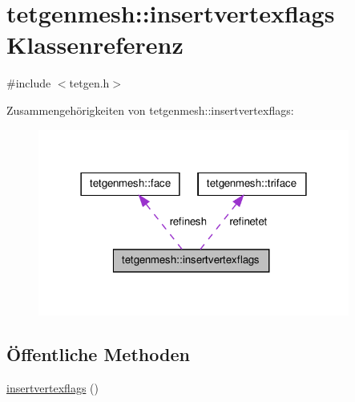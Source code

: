 \hypertarget{classtetgenmesh_1_1insertvertexflags}{\section{tetgenmesh\-:\-:insertvertexflags Klassenreferenz}
\label{classtetgenmesh_1_1insertvertexflags}
}


{\ttfamily \#include $<$tetgen.\-h$>$}



Zusammengehörigkeiten von tetgenmesh\-:\-:insertvertexflags\-:
\nopagebreak
\begin{figure}[H]
\begin{center}
\leavevmode
\includegraphics[width=290pt]{classtetgenmesh_1_1insertvertexflags__coll__graph}
\end{center}
\end{figure}
\subsection*{Öffentliche Methoden}
\begin{DoxyCompactItemize}
\item 
\hyperlink{classtetgenmesh_1_1insertvertexflags_af7e418fe9c850fd55757152189e8c6ee}{insertvertexflags} ()
\end{DoxyCompactItemize}
